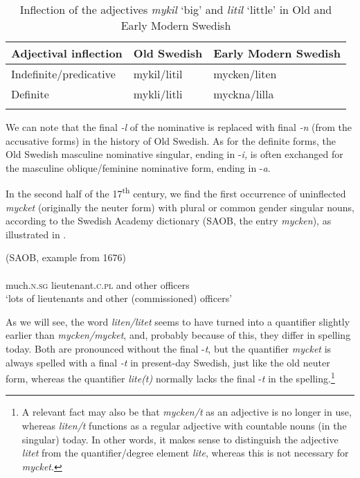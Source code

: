 \documentclass[output=paper]{langscibook}
\begin{document}
\begin{table}
\caption{Inflection of the adjectives \textit{mykil} ‘big’ and \textit{litil} ‘little’ in Old and Early Modern Swedish}
\label{tab:delsing:1}
\begin{tabular}{lll}
\lsptoprule
Adjectival inflection & Old Swedish & Early Modern Swedish\\
\midrule
Indefinite/predicative & mykil\slash litil & mycken\slash liten\\
Definite & mykli\slash litli & myckna\slash lilla\\
\lspbottomrule
\end{tabular}
\end{table}

We can note that the final \textit{{}-l} of the nominative is replaced with final \textit{{}-n} (from the accusative forms) in the history of Old Swedish. As for the definite forms, the Old Swedish masculine nominative singular, ending in -\textit{i,} is often exchanged for the masculine oblique/feminine nominative form, ending in -\textit{a}.



In the second half of the 17\textsuperscript{th} century, we find the first occurrence of uninflected \textit{mycket} (originally the neuter form) with plural or common gender singular nouns, according to the Swedish Academy dictionary (SAOB, the entry \textit{mycken}), as illustrated in .


\ea\label{ex:delsing:5}
(SAOB, example from 1676)\\
\\
much.\textsc{n.sg}   lieutenant.\textsc{c}.\textsc{pl}    and    other      officers\\
\glt ‘lots of lieutenants and other (commissioned) officers’ 
\z


As we will see, the word \textit{liten/litet} seems to have turned into a quantifier slightly earlier than \textit{mycken/mycket}, and, probably because of this, they differ in spelling today. Both are pronounced without the final -\textit{t}, but the quantifier \textit{mycket} is always spelled with a final \textit{{}-t} in present-day Swedish, just like the old neuter form, whereas the quantifier \textit{lite(t)} normally lacks the final -\textit{t} in the spelling.\footnote{A relevant fact may also be that \textit{mycken/t} as an adjective is no longer in use, whereas \textit{liten/t} functions as a regular adjective with countable nouns (in the singular) today. In other words, it makes sense to distinguish the adjective \textit{litet} from the quantifier/degree element \textit{lite}, whereas this is not necessary for \textit{mycket}.}
\end{document}
